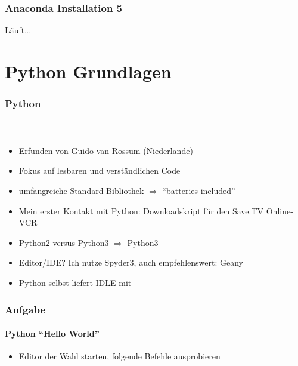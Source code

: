 \documentclass[12pt,ngerman]{beamer}
\newcounter{Aufgabe}
\newcommand{\Aufgabe}{Aufgabe~%
\stepcounter{Aufgabe}%
\theAufgabe%
}
\begin{document}
\begin{frame}
\frametitle{Anaconda Installation 5}

Läuft\ldots

\begin{center}
\end{center}

\end{frame}





\section{Python Grundlagen}

\begin{frame}
\frametitle{Python}
\framesubtitle{~}

\begin{itemize}
	\item Erfunden von Guido van Rossum (Niederlande)
	\item Fokus auf lesbaren und verständlichen Code
	\item umfangreiche Standard-Bibliothek $\Rightarrow$  \enquote{batteries included} 
	\item Mein erster Kontakt mit Python: Downloadskript für den Save.TV Online-VCR
	\item Python2 versus Python3 $\Rightarrow$ Python3
	\item Editor/IDE? Ich nutze Spyder3, auch empfehlenswert: Geany
	\item Python selbst liefert IDLE mit
\end{itemize}
\end{frame}

\begin{frame}[fragile]
\frametitle{\Aufgabe}
\framesubtitle{Python \enquote{Hello World}}

\begin{itemize}
	\item Editor der Wahl starten, folgende Befehle ausprobieren
\end{itemize}



\end{frame}
\end{document}
